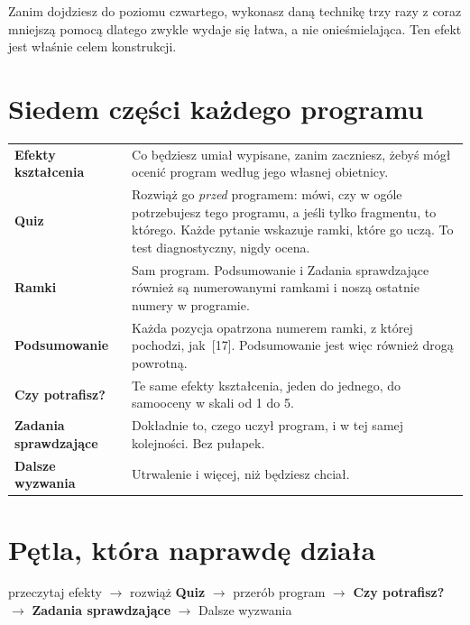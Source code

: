 \noindent
Zanim dojdziesz do poziomu czwartego, wykonasz daną technikę trzy razy z coraz
mniejszą pomocą \dash{} dlatego zwykle wydaje się łatwa, a nie onieśmielająca. Ten
efekt jest właśnie celem konstrukcji.

\section*{Siedem części każdego programu}

\begin{center}
\small
\begin{tabularx}{\linewidth}{@{}lX@{}}
\toprule
\textbf{Efekty kształcenia} & Co będziesz umiał \dash{} wypisane, zanim
  zaczniesz, żebyś mógł ocenić program według jego własnej obietnicy. \\
\textbf{Quiz} & Rozwiąż go \emph{przed} programem: mówi, czy w ogóle
  potrzebujesz tego programu, a jeśli tylko fragmentu, to którego. Każde
  pytanie wskazuje ramki, które go uczą. To test diagnostyczny, nigdy ocena. \\
\textbf{Ramki} & Sam program. Podsumowanie i Zadania sprawdzające
  również są numerowanymi ramkami i noszą ostatnie numery w programie. \\
\textbf{Podsumowanie} & Każda pozycja opatrzona numerem ramki, z której
  pochodzi, \mbox{jak [17]}. Podsumowanie jest więc również drogą powrotną. \\
\textbf{Czy potrafisz?} & Te same efekty kształcenia, jeden do jednego, do
  samooceny w skali od 1 do 5. \\
\textbf{Zadania sprawdzające} & Dokładnie to, czego uczył program, i w tej
  samej kolejności. Bez pułapek. \\
\textbf{Dalsze wyzwania} & Utrwalenie \dash{} i więcej, niż będziesz chciał. \\
\bottomrule
\end{tabularx}
\end{center}

\section*{Pętla, która naprawdę działa}

\begin{center}
\begin{tcolorbox}[enhanced, sharp corners, width=0.94\linewidth,
  colback=mlight, colframe=mblue, boxrule=0pt, leftrule=3pt,
  left=10pt, right=10pt, top=8pt, bottom=8pt]
przeczytaj efekty $\rightarrow$ rozwiąż \textbf{Quiz} $\rightarrow$ przerób
program $\rightarrow$ \textbf{Czy potrafisz?} $\rightarrow$ \textbf{Zadania
sprawdzające} $\rightarrow$ Dalsze wyzwania
\end{tcolorbox}
\end{center}

